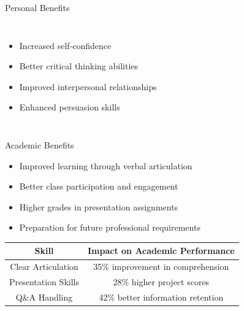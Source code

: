 \documentclass{beamer}
\begin{document}
\begin{frame}{Personal Benefits}
    \begin{columns}
        \begin{itemize}
            \item Increased self-confidence
            \item Better critical thinking abilities
            \item Improved interpersonal relationships
            \item Enhanced persuasion skills
        \end{itemize}
        
        \begin{center}
        \end{center}
    \end{columns}
\end{frame}

\begin{frame}{Academic Benefits}
    \begin{itemize}
        \item Improved learning through verbal articulation
        \item Better class participation and engagement
        \item Higher grades in presentation assignments
        \item Preparation for future professional requirements
    \end{itemize}
    
    \begin{center}
        \begin{tabular}{cc}
            \toprule
            \textbf{Skill} & \textbf{Impact on Academic Performance} \\
            \midrule
            Clear Articulation & 35\% improvement in comprehension \\
            Presentation Skills & 28\% higher project scores \\
            Q\&A Handling & 42\% better information retention \\
            \bottomrule
        \end{tabular}
    \end{center}
\end{frame}
\end{document}
